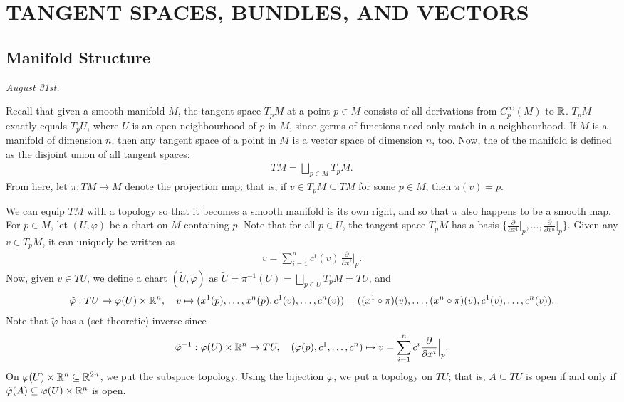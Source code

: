 \chapter{TANGENT SPACES, BUNDLES, AND VECTORS}


\section{Manifold Structure}
\noindent \textit{August 31st.}

Recall that given a smooth manifold $M$, the tangent space $T_{p}M$ at a point $p \in M$ consists of all derivations from $C_{p}^{\infty}(M)$ to $\mathbb{R}$. $T_{p}M$ exactly equals $T_{p}U$, where $U$ is an open neighbourhood of $p$ in $M$, since germs of functions need only match in a neighbourhood. If $M$ is a manifold of dimension $n$, then any tangent space of a point in $M$ is a vector space of dimension $n$, too. Now, the  of the manifold is defined as the disjoint union of all tangent spaces:
\begin{align}
    TM = \bigsqcup_{p \in M} T_{p}M.
\end{align}
From here, let $\pi:TM \to M$ denote the projection map; that is, if $v \in T_{p}M \subseteq TM$ for some $p \in M$, then $\pi(v) = p$.


We can equip $TM$ with a topology so that it becomes a smooth manifold is its own right, and so that $\pi$ also happens to be a smooth map. For $p \in M$, let $(U,\varphi)$ be a chart on $M$ containing $p$. Note that for all $p \in U$, the tangent space $T_{p}M$ has a basis $\{\frac{\partial}{\partial x^{1}}\big|_{p},\ldots,\frac{\partial}{\partial x^{n}}\big|_{p}\}$. Given any $v \in T_{p}M$, it can uniquely be written as
\begin{align}
    v = \sum_{i=1}^{n} c^{i}(v) \, \frac{\partial}{\partial x^{i}} \Big|_{p}.
\end{align}
Now, given $v \in TU$, we define a chart $(\tilde{U},\tilde{\varphi})$ as $\tilde{U} = \pi^{-1}(U) = \bigsqcup_{p \in U} T_{p}M = TU$, and
\begin{align}
    \tilde{\varphi}:TU \to \varphi(U) \times \mathbb{R}^{n}, \quad v \mapsto (x^{1}(p),\ldots,x^{n}(p),c^{1}(v),\ldots,c^{n}(v)) = ((x^{1} \circ \pi)(v),\ldots,(x^{n} \circ \pi)(v),c^{1}(v),\ldots,c^{n}(v)).
\end{align}
Note that $\tilde{\varphi}$ has a (set-theoretic) inverse since
\begin{align}
    \tilde{\varphi}^{-1}:\varphi(U) \times \mathbb{R}^{n} \to TU, \quad (\varphi(p),c^{1},\ldots,c^{n}) \mapsto v = \sum_{i=1}^{n} c^{i} \frac{\partial}{\partial x^{i}} \Big|_{p}.
\end{align}
On $\varphi(U) \times \mathbb{R}^{n} \subseteq \mathbb{R}^{2n}$, we put the subspace topology. Using the bijection $\tilde{\varphi}$, we put a topology on $TU$; that is, $A \subseteq TU$ is open if and only if $\tilde{\varphi}(A) \subseteq \varphi(U) \times \mathbb{R}^{n}$ is open.


